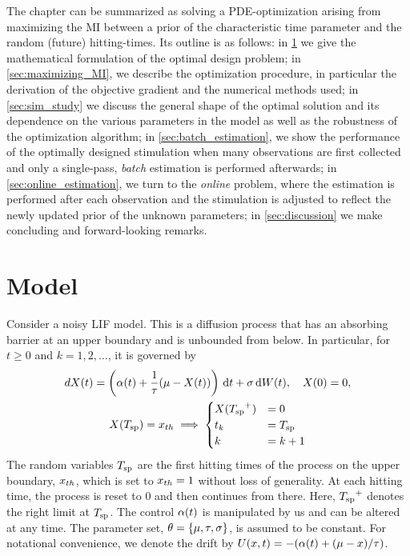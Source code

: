 The chapter can be summarized as solving a PDE-optimization arising from
maximizing the MI between a prior of the characteristic time parameter and the
random (future) hitting-times. Its outline is as  follows:  in
\cref{sec:problem_formulation} we give the mathematical formulation of the
optimal design problem; in \cref{sec:maximizing_MI}, we describe the
optimization procedure, in particular the derivation of the objective gradient
and the numerical methods used; in \cref{sec:sim_study} we discuss the general
shape of the optimal solution and its dependence on the various parameters in
the model as well as the robustness of the optimization algorithm; in
\cref{sec:batch_estimation}, we show the performance of the optimally designed
stimulation when many observations are first collected and only a single-pass,
{\sl batch} estimation is performed afterwards; in \cref{sec:online_estimation},
we turn to the {\sl online} problem, where the estimation is performed after
each observation and the stimulation is adjusted to reflect the newly updated
prior of the unknown parameters; in \cref{sec:discussion} we make concluding and
forward-looking remarks.
 

\section{Model}
\label{sec:problem_formulation}
Consider a noisy LIF model. This is a diffusion process that has an absorbing
barrier at an upper boundary and is unbounded from below. In particular, for $t
\geq 0$ and $k=1,2,\ldots$, it is governed by
\begin{equation}
\begin{gathered}
dX(t) = \left(\a(t) + \frac 1\tc(\m %
 - {X(t)} ) \right) \intd{t} + \s\intd{W(t)},
\quad X(0) = 0,
\\
X(\ts) = \xth \implies  
\begin{cases}  
X(\ts^+) &= 0   
\\
t_k &=  \ts
\\
k  &= k+1
\end{cases}
\end{gathered} 
\label{eq:X_evolution_uo_control}
\end{equation}
The random variables ${ T_{\textrm{sp} } }$ are the first hitting times of the process on the upper
boundary, ${ x_{th} }$, which is set to ${ x_{th} }=1$ without loss of generality. At each hitting time,
the process is reset to $0$ and then continues from there. Here,
${ T_{\textrm{sp} } }^+$ denotes the right limit at ${ T_{\textrm{sp} } }$. The control 
$\alpha(t)$ is manipulated by us and can be altered at any
time. The parameter set,
${ \theta} = \{{\mu }, { \tau }, \sigma\}$, is assumed to be constant. For notational
convenience, we denote the drift by $U(x,t)=-(\alpha(t) + ({\mu }  - x )/{ \tau })$.

